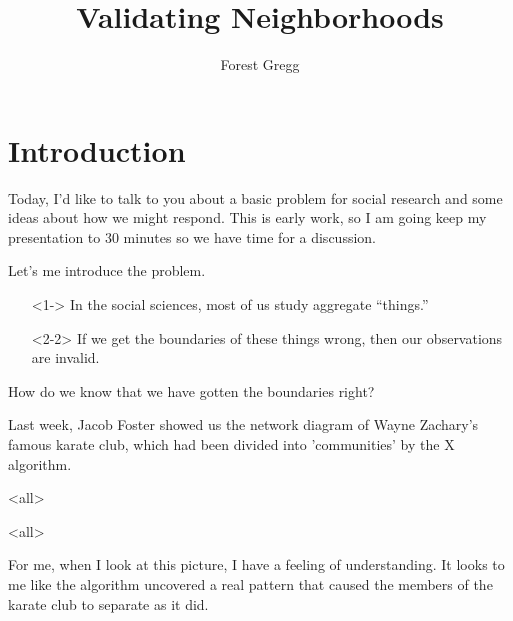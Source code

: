
\usepackage[english]{babel}
\usepackage{tikz}
\title{Validating Neighborhoods}
\author{Forest Gregg}

\mode*
\maketitle

\section{Introduction}
Today, I'd like to talk to you about a basic problem for social
research and some ideas about how we might respond. This is early
work, so I am going keep my presentation to 30 minutes so we have time
for a discussion.

Let's me introduce the problem.



\begin{frame}
\begin{itemize}{}
\item[]<1-> In the social sciences, most of us study
  aggregate ``things.''    
\pause
\item[]<2-2> If we get the boundaries of these things wrong, then our
  observations are invalid.
\end{itemize}
\end{frame}

\begin{frame}
\begin{center}
How do we know that we have gotten the boundaries right?
\end{center}
\end{frame}



Last week, Jacob Foster showed us the network diagram of Wayne
Zachary's famous karate club, which had been divided into
'communities' by the X algorithm. 


\mode<all>{
}



\testframe{}

\mode<all>{
\blackout{}
}  

For me, when I look at this picture, I have a feeling of
understanding. It looks to me like the algorithm uncovered a real
pattern that caused the members of the karate club to separate as it
did. 

